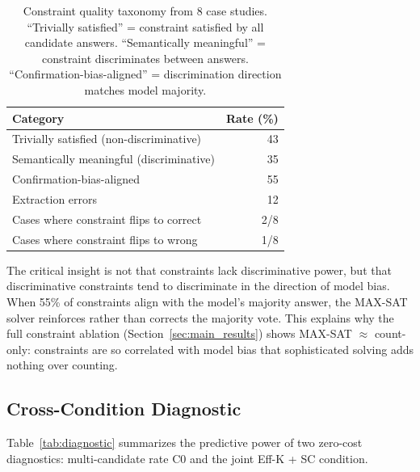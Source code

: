 \documentclass[11pt,a4paper]{article}
\begin{document}
\begin{table}[t]
\centering
\caption{Constraint quality taxonomy from 8 case studies. ``Trivially satisfied'' = constraint satisfied by all candidate answers. ``Semantically meaningful'' = constraint discriminates between answers. ``Confirmation-bias-aligned'' = discrimination direction matches model majority.}
\label{tab:constraint_quality}
\small
\begin{tabular}{lr}
\toprule
\textbf{Category} & \textbf{Rate (\%)} \\
\midrule
Trivially satisfied (non-discriminative) & 43 \\
Semantically meaningful (discriminative)  & 35 \\
Confirmation-bias-aligned                 & 55 \\
Extraction errors                         & 12 \\
\midrule
Cases where constraint flips to correct   & 2/8 \\
Cases where constraint flips to wrong     & 1/8 \\
\bottomrule
\end{tabular}
\end{table}

The critical insight is not that constraints lack discriminative power, but that discriminative constraints tend to discriminate in the direction of model bias. When 55\% of constraints align with the model's majority answer, the MAX-SAT solver reinforces rather than corrects the majority vote. This explains why the full constraint ablation (Section~\ref{sec:main_results}) shows MAX-SAT $\approx$ count-only: constraints are so correlated with model bias that sophisticated solving adds nothing over counting.

\subsection{Cross-Condition Diagnostic}
\label{sec:diagnostic}

Table~\ref{tab:diagnostic} summarizes the predictive power of two zero-cost diagnostics: multi-candidate rate C0 and the joint Eff-K + SC condition.
\end{document}
